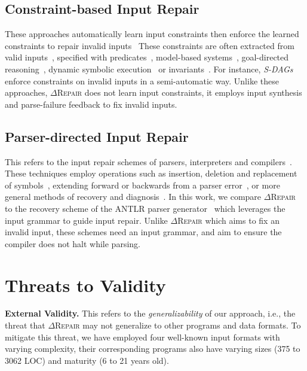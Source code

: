 \documentclass[sigconf,review,anonymous]{acmart}
\newcommand{\approach}{\textsc{$\Delta$Repair}\xspace}
\begin{document}
\subsection{Constraint-based Input Repair} %
These approaches automatically learn input constraints then enforce the learned constraints to repair invalid inputs~\cite{hussain2010dynamic, Demsky:2006:IED:1146238.1146266} 
These constraints are often extracted from valid inputs~\cite{Long:2012:AIR:2337223.2337233, Rinard:2007:LCZ:1297027.1297072}, specified with predicates~\cite{elkarablieh2008juzi}, model-based systems~\cite{Demsky:2003:ADR:949343.949314}, goal-directed reasoning~\cite{1553560}, dynamic symbolic execution~\cite{hussain2010dynamic} or invariants~\cite{Demsky:2006:IED:1146238.1146266}. For instance, \emph{S-DAGs}~\cite{scheffczyk2004s} enforce constraints on invalid inputs in a semi-automatic way. Unlike these approaches, \approach does not learn input constraints, it employs input synthesis and parse-failure feedback to fix invalid inputs. 


\subsection{Parser-directed Input Repair} %
This refers to the input repair schemes of parsers, interpreters and compilers~\cite{parr2011ll, diekmann2020dont, aho1972minimum, hammond1984survey, backhouse1979syntax}. 
These techniques employ operations such as insertion, deletion and replacement of symbols~\cite{anderson1981locally, cerecke2003locally, anderson1983assessment}, extending forward or backwards from a parser error~\cite{burke1982practical, mauney1982forward}, or more general methods of recovery and diagnosis~\cite{krawczyk1980error, aho1972minimum}. 
In this work, we compare \approach to the recovery scheme of the ANTLR parser generator~\cite{parr2011ll} which leverages the input grammar to guide input repair. %
Unlike \approach which aims to fix an invalid input, these schemes need an input grammar, and aim to ensure the compiler does not halt while parsing. 



\section{Threats to Validity}
\label{sec:threats}

\noindent\textbf{External Validity.} This refers to the \textit{generalizability} of our approach, i.e., 
the threat that \approach may not generalize to other programs and data formats. 
To mitigate this threat, we have employed four well-known input formats with varying complexity, their corresponding programs also have  varying sizes (375 to 3062 LOC) and maturity (6 to 21 years old). 
\end{document}
